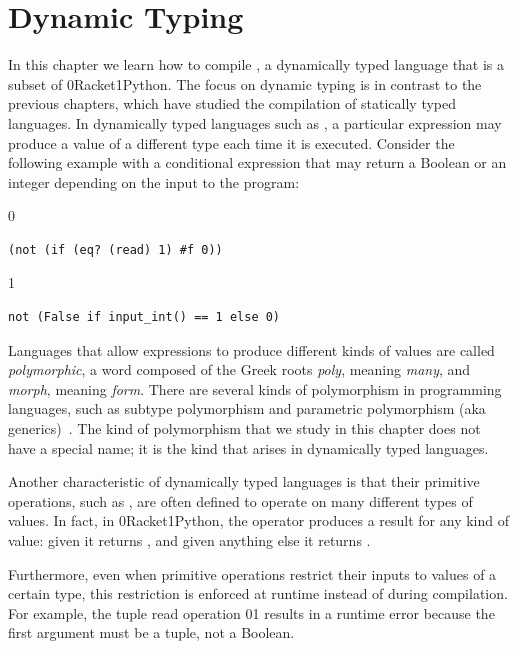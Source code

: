 \documentclass[7x10]{TimesAPriori_MIT}%
\def\racketEd{0}
\def\pythonEd{1}
\providecommand{\BookEdition}{1}
\let\edition\BookEdition
\newcommand{\racket}[1]{{\if\edition\racketEd{#1}\fi}}
\newcommand{\pythonColor}[0]{}
\newcommand{\python}[1]{{\if\edition\pythonEd\pythonColor #1\fi}}
\numberwithin{theorem}{chapter}
\numberwithin{definition}{chapter}
\numberwithin{equation}{chapter}
\begin{document}

\chapter{Dynamic Typing}
\label{ch:Ldyn}
\setcounter{footnote}{0}

In this chapter we learn how to compile \LangDyn{}, a dynamically
typed language that is a subset of \racket{Racket}\python{Python}. The
focus on dynamic typing is in contrast to the previous chapters, which
have studied the compilation of statically typed languages. In
dynamically typed languages such as \LangDyn{}, a particular
expression may produce a value of a different type each time it is
executed. Consider the following example with a conditional 
expression that may return a Boolean or an integer depending on the
input to the program:
{\if\edition\racketEd
\begin{lstlisting}
(not (if (eq? (read) 1) #f 0))
\end{lstlisting}
\fi}
{\if\edition\pythonEd\pythonColor
\begin{lstlisting}
not (False if input_int() == 1 else 0)
\end{lstlisting}
\fi}

Languages that allow expressions to produce different kinds of values
are called \emph{polymorphic}, a word composed of the Greek roots
\emph{poly}, meaning \emph{many}, and \emph{morph}, meaning \emph{form}.
There are several kinds of polymorphism in programming languages, such as
subtype polymorphism and
parametric polymorphism
(aka generics)~\citep{Cardelli:1985kx}. The kind of polymorphism that we
study in this chapter does not have a special name; it is the kind
that arises in dynamically typed languages.

Another characteristic of dynamically typed languages is that
their primitive operations, such as , are often defined to operate
on many different types of values.  In fact, in
\racket{Racket}\python{Python}, the  operator produces a
result for any kind of value: given \FALSE{} it returns \TRUE{}, and
given anything else it returns \FALSE{}.

Furthermore, even when primitive operations restrict their inputs to
values of a certain type, this restriction is enforced at runtime
instead of during compilation. For example, the tuple read
operation \racket{}\python{}
results in a runtime error because the first argument must
be a tuple, not a Boolean.
\end{document}

